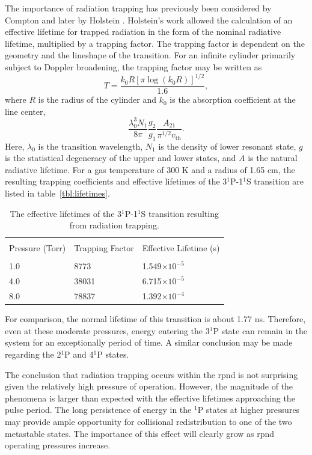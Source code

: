 The importance of radiation trapping has previously been considered by Compton
\cite{compton1922} and later by Holstein \cite{Holstein1947, Holstein1951}.
Holstein's work allowed the calculation of an effective lifetime for trapped
radiation in the form of the nominal radiative lifetime, multiplied by a
trapping factor. The trapping factor is dependent on the geometry and the
lineshape of the transition. For an infinite cylinder primarily subject to
Doppler broadening, the trapping factor may be written as
\begin{equation}
  T = \frac{k_0R\left[\pi\log(k_0R)\right]^{1/2}}{1.6},
\end{equation}
where $R$ is the radius of the cylinder and $k_0$ is the absorption coefficient
at the line center,
\begin{equation}
  \frac{\lambda_0^3N_1}{8\pi} \frac{g_2}{g_1} \frac{A_{21}}{\pi^{1/2}v_\mathrm{th}}.
\end{equation}
Here, $\lambda_0$ is the transition wavelength, $N_1$ is the density of lower
resonant state, $g$ is the statistical degeneracy of the upper and lower states,
and $A$ is the natural radiative lifetime. For a gas temperature of 300 K and a
radius of 1.65 cm, the resulting trapping coefficients and effective lifetimes
of the 3$^1$P-1$^1$S transition are listed in table~\ref{tbl:lifetimes}.
\begin{table}
  \centering
  \caption{The effective lifetimes of the 3$^1$P-1$^1$S transition resulting
    from radiation trapping.}
  \begin{tabular}{lll}
    \toprule \\
    Pressure (Torr) & Trapping Factor & Effective Lifetime (s) \\
    \midrule \\
    1.0             & 8773            & 1.549$\times10^{-5}$   \\
    4.0             & 38031           & 6.715$\times10^{-5}$   \\
    8.0             & 78837           & 1.392$\times10^{-4}$   \\
    \bottomrule
  \end{tabular}
\end{table}
For comparison, the normal lifetime of this transition is about 1.77 ns.
Therefore, even at these moderate pressures, energy entering the 3$^1$P state
can remain in the system for an exceptionally period of time. A similar
conclusion may be made regarding the 2$^1$P and 4$^1$P states.

The conclusion that radiation trapping occurs within the \acs{rpnd} is not
surprising given the relatively high pressure of operation. However, the
magnitude of the phenomena is larger than expected with the effective lifetimes
approaching the pulse period. The long persistence of energy in the $^1$P states
at higher pressures may provide ample opportunity for collisional redistribution
to one of the two metastable states. The importance of this effect will clearly
grow as \acs{rpnd} operating pressures increase.

